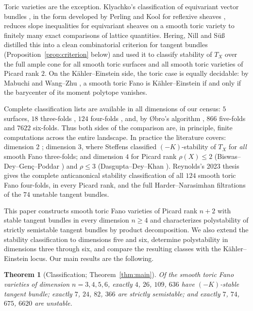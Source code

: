 \documentclass[11pt]{amsart}
\newtheorem{theorem}{Theorem}[section]
\theoremstyle{definition}
\theoremstyle{remark}
\begin{document}
Toric varieties are the exception. Klyachko's classification of
equivariant vector bundles \cite{Klyachko1990}, in the form developed by
Perling and Kool for reflexive sheaves \cite{Perling2004,Kool2011},
reduces slope inequalities for equivariant sheaves on a smooth toric
variety to finitely many exact comparisons of lattice quantities.
Hering, Nill and S\"u\ss{} \cite{HNS2022} distilled this into a clean
combinatorial criterion for tangent bundles
(Proposition~\ref{prop:criterion} below) and used it to classify
stability of $T_X$ over the full ample cone for all smooth toric surfaces
and all smooth toric varieties of Picard rank $2$. On the
K\"ahler--Einstein side, the toric case is equally decidable: by
Mabuchi and Wang--Zhu \cite{Mabuchi1987,WangZhu2004}, a smooth toric Fano
is K\"ahler--Einstein if and only if the barycenter of its moment
polytope vanishes.

Complete classification lists are available in all dimensions of our census:
$5$ surfaces, $18$ three-folds \cite{WatanabeWatanabe1982,Batyrev1999}, $124$
four-folds \cite{Batyrev1999,Sato2000}, and, by \O bro's algorithm
\cite{Obro2007}, $866$ five-folds and $7622$ six-folds. Thus both sides of
the comparison are, in principle, finite computations across the entire
landscape. In practice the literature covers: dimension $2$
\cite{Fahlaoui1989,HNS2022}; dimension $3$, where Steffens
\cite{Steffens1996} classified $(-K)$-stability of $T_X$ for \emph{all}
smooth Fano three-folds; and dimension $4$ for Picard rank
$\rho(X) \le 2$ (Biswas--Dey--Gen\c{c}--Poddar \cite{BDGP2021}) and
$\rho \le 3$ (Dasgupta--Dey--Khan \cite{DDK}). Reynolds's 2023 thesis
\cite[Appendix~A]{Reynolds2023} gives the complete anticanonical
stability classification of all $124$ smooth toric Fano four-folds, in
every Picard rank, and the full Harder--Narasimhan filtrations of the
$74$ unstable tangent bundles.

This paper constructs smooth toric Fano varieties of Picard rank $n+2$
with stable tangent bundles in every dimension $n\ge4$ and characterizes
polystability of strictly semistable tangent bundles by product
decomposition. We also extend the stability classification to dimensions
five and six, determine polystability in dimensions three through six,
and compare the resulting classes with the K\"ahler--Einstein locus.
Our main results are the following.

\begin{theorem}[Classification; Theorem~\ref{thm:main}]
Of the smooth toric Fano varieties of dimension $n = 3, 4, 5, 6$, exactly
$4$, $26$, $109$, $636$ have $(-K)$-stable tangent bundle; exactly
$7$, $24$, $82$, $366$ are strictly semistable; and exactly $7$,
$74$, $675$, $6620$ are unstable.
\end{theorem}
\end{document}
